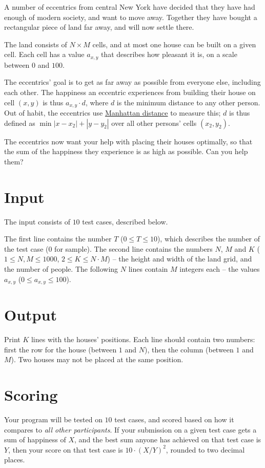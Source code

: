 A number of eccentrics from central New York have decided that they have had enough of modern society, and want to move away.
Together they have bought a rectangular piece of land far away, and will now settle there.

The land consists of $N \times M$ cells, and at most one house can be built on a given cell.
Each cell has a value $a_{x,y}$ that describes how pleasant it is, on a scale between $0$ and $100$.

The eccentrics' goal is to get as far away as possible from everyone else, including each other.
The happiness an eccentric experiences from building their house on cell $(x,y)$ is thus $a_{x,y} \cdot d$,
where $d$ is the minimum distance to any other person.
Out of habit, the eccentrics use
\href{https://en.wikipedia.org/wiki/Taxicab_geometry}{Manhattan distance}
to measure this;
$d$ is thus defined as $\min |x - x_2| + |y - y_2|$ over all other persons' cells $(x_2, y_2)$.

The eccentrics now want your help with placing their houses optimally, so that the sum of
the happiness they experience is as high as possible. Can you help them?

\section*{Input}
The input consists of $10$ test cases, described below.

The first line contains the number $T$ ($0 \le T \le 10$), which describes the number of the test case ($0$ for sample).
The second line contains the numbers $N$, $M$ and $K$ ($1 \le N, M \le 1000$, $2 \le K \le N \cdot M$) -- the height and width of the land grid, and the number of people.
The following $N$ lines contain $M$ integers each -- the values $a_{x,y}$ ($0 \le a_{x,y} \le 100$).

\section*{Output}
Print $K$ lines with the houses' positions.
Each line should contain two numbers: first the row for the house (between $1$ and $N$), then the column (between $1$ and $M$).
Two houses may not be placed at the same position.

\section*{Scoring}
Your program will be tested on $10$ test cases, and scored based on how it compares to \emph{all other participants}.
If your submission on a given test case gets a sum of happiness of $X$, and the best sum anyone has achieved on that test case is $Y$,
then your score on that test case is $10 \cdot (X / Y)^2$, rounded to two decimal places.

